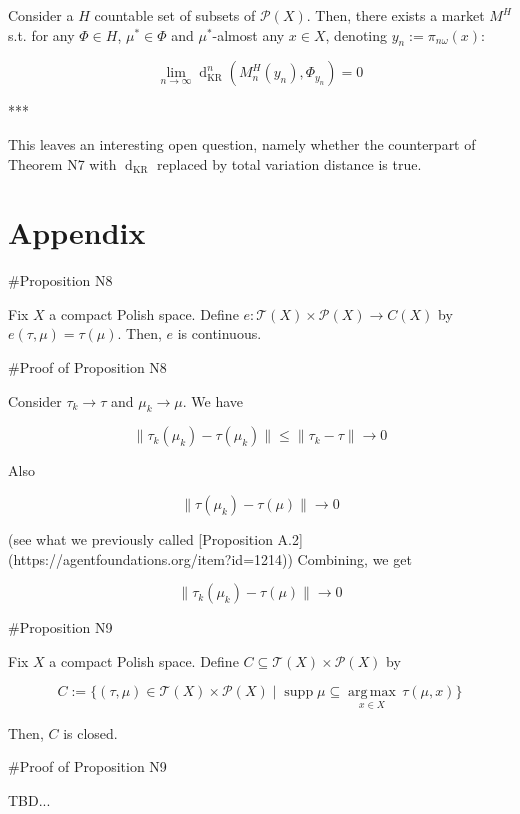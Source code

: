 \documentclass[a4paper]{article}
\DeclareMathOperator{\Supp}{supp}
\newcommand{\Argmax}[1]{\underset{#1}{\operatorname{arg\,max}}\,}
\newcommand{\Norm}[1]{\lVert #1 \rVert}
\newcommand{\Prob}{\mathcal{P}}
\newcommand{\T}{\mathcal{T}}
\newcommand{\Dkr}{\operatorname{d}_{\text{KR}}}
\begin{document}
Consider a ${H}$ countable set of subsets of ${\Prob(X)}$. Then, there exists a market ${M^H}$ s.t. for any ${\Phi \in H}$, ${\mu^* \in \Phi}$ and ${\mu^*}$-almost any ${x \in X}$, denoting ${y_n:=\pi_{n\omega}(x)}$:

$$\lim_{n \rightarrow \infty} \Dkr^n(M^H_n(y_n),\Phi_{y_n}) = 0$$

***

This leaves an interesting open question, namely whether the counterpart of Theorem N7 with ${\Dkr}$ replaced by total variation distance is true.

\section{Appendix}

\#Proposition N8

Fix ${X}$ a compact Polish space. Define ${e: \T(X) \times \Prob(X) \rightarrow C(X)}$ by ${e(\tau, \mu) = \tau(\mu)}$. Then, ${e}$ is continuous.

\#Proof of Proposition N8

Consider ${\tau_k \rightarrow \tau}$ and ${\mu_k \rightarrow \mu}$. We have

$$\Norm{\tau_k(\mu_k)-\tau(\mu_k)} \leq \Norm{\tau_k - \tau} \rightarrow 0$$

Also

$$\Norm{\tau(\mu_k)-\tau(\mu)} \rightarrow 0$$

(see what we previously called [Proposition A.2](https://agentfoundations.org/item?id=1214)) Combining, we get

$$\Norm{\tau_k(\mu_k)-\tau(\mu)} \rightarrow 0$$

\#Proposition N9

Fix ${X}$ a compact Polish space. Define ${C \subseteq \T(X) \times \Prob(X)}$ by

$$C:=\{(\tau,\mu) \in \T(X) \times \Prob(X) \mid \Supp \mu \subseteq \Argmax{x \in X} \tau(\mu,x)\}$$

Then, ${C}$ is closed.

\#Proof of Proposition N9

TBD...
\end{document}
